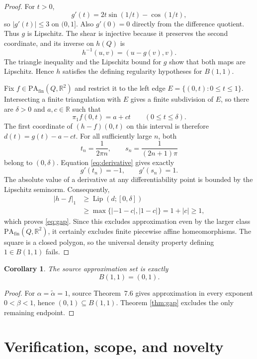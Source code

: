 \documentclass[10pt]{article}
\newtheorem{corollary}{Corollary}
\newcommand{\R}{\mathbb R}
\newcommand{\Lip}{\operatorname{Lip}}
\newcommand{\pa}{\mathrm{PA}_{\mathrm{fin}}}
\begin{document}
\begin{proof}
For $t>0$,
\begin{equation}
 g'(t)=2t\sin(1/t)-\cos(1/t),
 \label{eq:derivative}
\end{equation}
so $|g'(t)|\leq3$ on $(0,1]$.  Also $g'(0)=0$ directly from the
difference quotient.  Thus $g$ is Lipschitz.  The shear is injective because
it preserves the second coordinate, and its inverse on $h(Q)$ is
\[
 h^{-1}(u,v)=(u-g(v),v).
\]
The triangle inequality and the Lipschitz bound for $g$ show that both maps
are Lipschitz.  Hence $h$ satisfies the defining regularity hypotheses for
$B(1,1)$.

Fix $f\in\pa(Q,\R^2)$ and restrict it to the left edge
$E=\{(0,t):0\leq t\leq1\}$.  Intersecting a finite triangulation with $E$
gives a finite subdivision of $E$, so there are $\delta>0$ and $a,c\in\R$
such that
\[
 \pi_1 f(0,t)=a+ct\qquad(0\leq t\leq\delta).
\]
The first coordinate of $(h-f)(0,t)$ on this interval is therefore
$d(t)=g(t)-a-ct$.  For all sufficiently large $n$, both
\[
 t_n=\frac1{2\pi n},\qquad s_n=\frac1{(2n+1)\pi}
\]
belong to $(0,\delta)$.  Equation \eqref{eq:derivative} gives exactly
\[
 g'(t_n)=-1,\qquad g'(s_n)=1.
\]
The absolute value of a derivative at any differentiability point is bounded
by the Lipschitz seminorm.  Consequently,
\begin{align*}
 |h-f|_1
 &\geq \Lip(d;[0,\delta])\\
 &\geq \max\{|{-1-c}|,|{1-c}|\}
  =1+|c|\geq1,
\end{align*}
which proves \eqref{eq:gap}.  Since this excludes approximation even by the
larger class $\pa(Q,\R^2)$, it certainly excludes finite piecewise affine
homeomorphisms.  The square is a closed polygon, so the universal density
property defining $1\in B(1,1)$ fails.
\end{proof}

\begin{corollary}
The source approximation set is exactly
\[
 B(1,1)=(0,1).
\]
\end{corollary}

\begin{proof}
For $\alpha=\widetilde\alpha=1$, source Theorem~7.6 gives approximation in
every exponent $0<\beta<1$, hence $(0,1)\subseteq B(1,1)$.  Theorem
\ref{thm:gap} excludes the only remaining endpoint.
\end{proof}

\section{Verification, scope, and novelty}
\end{document}

